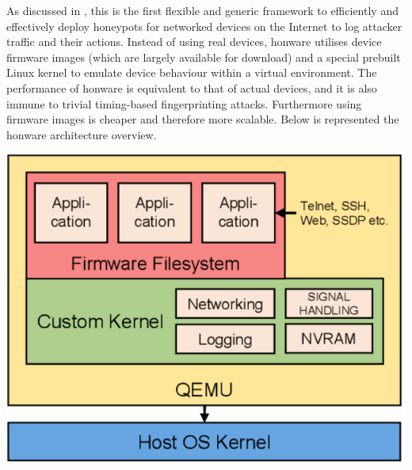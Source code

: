 \documentclass[epsfig,a4paper,11pt,titlepage,oneside,openany]{book}
\begin{document}
As discussed in \cite{Honware}, this is the first flexible and generic framework to efficiently and effectively deploy honeypots for networked devices on the Internet to log attacker traffic and their actions.
Instead of using real devices, honware utilises device firmware images (which are largely available for download) and a special prebuilt Linux kernel to emulate device behaviour within a virtual environment.
The performance of honware is equivalent to that of actual devices, and it is also immune to trivial timing-based fingerprinting attacks. Furthermore using firmware images is cheaper and therefore more scalable.
Below is represented the honware architecture overview.
\begin{center}
\includegraphics[scale=0.25]{honware}
\end{center}
\endgroup


%


\end{document}
